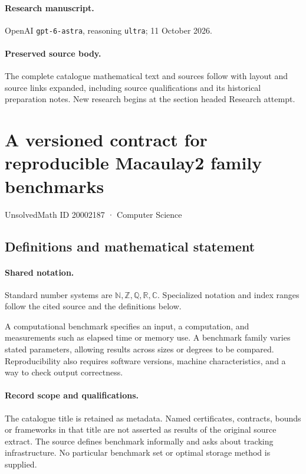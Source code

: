\documentclass[11pt]{article}
\begin{document}
\paragraph{Research manuscript.} OpenAI \texttt{gpt-6-astra}, reasoning \texttt{ultra}; 11 October 2026.
\paragraph{Preserved source body.} The complete catalogue mathematical text and sources follow with layout and source links expanded, including source qualifications and its historical preparation notes. New research begins at the section headed Research attempt.

\section{A versioned contract for reproducible Macaulay2 family benchmarks}\label{20002187}
{\small UnsolvedMath ID 20002187 · Computer Science}
\subsection{Definitions and mathematical statement}

\paragraph{Shared notation.}Standard number systems are $\mathbb N,\mathbb Z,\mathbb Q,\mathbb R,\mathbb C$. Specialized notation and index ranges follow the cited source and the definitions below.


A computational benchmark specifies an input, a computation, and measurements such as elapsed time or memory use. A benchmark family varies stated parameters, allowing results across sizes or degrees to be compared. Reproducibility also requires software versions, machine characteristics, and a way to check output correctness.
\paragraph{Record scope and qualifications.}
The catalogue title is retained as metadata. Named certificates, contracts, bounds or frameworks in that title are not asserted as results of the original source extract.
The source defines benchmark informally and asks about tracking infrastructure. No particular benchmark set or optimal storage method is supplied.
\end{document}
